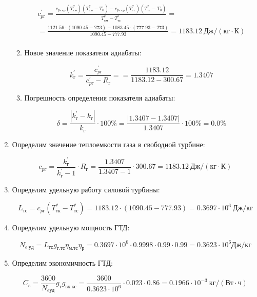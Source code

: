 \documentclass[a4paper,12pt]{article}
\begin{document}
\begin{enumerate}
\begin{enumerate}
		\begin{gather*}
		    c_{pг}^\prime = \frac{
			c_{pг\ ср}(T_{см}^*) (T_{см}^* - T_0) - c_{pг\ ср}(T_{тс}^*) (T_{тс}^* - T_0)
		}{
			T_{см}^* - T_{тс}^*} =\\
		    = \frac{
			1121.56 \cdot (1090.45 - 273) -
			1083.45 \cdot (777.93 - 273)
		}{
			1090.45 - 777.93} =
			1183.12 \ Дж / (кг \cdot К)\\
		\end{gather*}
		
		\item Новое значение показателя адиабаты:
		
		\[
		k_{г}^\prime = \frac{ c_{pг}^\prime }{ c_{pг}^\prime - R_г } = 
				= \frac{ 1183.12 }{ 1183.12 - 300.67} =
				1.3407
		\]
		
		\item Погрешность определения показателя адиабаты:
		
		\[
		\delta = \frac{ \left| k_{г}^\prime - k_{г} \right| }{ k_{г} } \cdot 100 \% =
				\frac{ \left|  1.3407 - 1.3407 \right| }{ 1.3407 } \cdot 100 \% =
				0.0 \%
		\]
	
	\end{enumerate}
	
	\item Определим значение теплоемкости газа в свободной турбине:
	
	\[
	c_{pг} = \frac{ k_г^\prime }{ k_г^\prime - 1 } \cdot R_г = 
			\frac{ 1.3407 }{ 1.3407 - 1 } \cdot 300.67
			= 1183.12\ Дж/(кг \cdot К)
	\]
	
	\item Определим удельную работу силовой турбины:
	
	\[
	L_{тс} = c_{pг} ( T_{тк}^* -  T_{тс}^*) = 
		1183.12 \cdot ( 1090.45 -  777.93 ) = 
		0.3697 \cdot 10^6\ Дж/кг
	\]
	
	\item Определим удельную мощность ГТД:
	
	
	
	\[
	N_{e\ уд} = L_{тс} g_{г.тс} \eta_{м.тс} \eta_р = 
			0.3697 \cdot 10^6 \cdot 0.9998 \cdot 0.99 \cdot 0.99 =
	0.3623 \cdot 10^6 Дж/кг
	\]
	
	\item Определим экономичность ГТД:
	
	
	
	\[
	C_e = \frac{ 3600 }{ N_{e уд} } g_т g_{вх.кс} = 
			\frac{ 3600 }{ 0.3623 \cdot 10^6} \cdot 0.023 \cdot 0.86 =
	0.1966 \cdot 10^{-3}\ кг/\left( Вт \cdot ч \right)
	\]
	

\end{enumerate}
\end{document}
